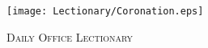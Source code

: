 \fancyhead[RE,LO]{}\fancyhead[RO,LE]{}
\fancyhead[C]{}
\thispagestyle{empty}
{}
   
\begin{figure}[H]
    \centering
    \texttt{[image: Lectionary/Coronation.eps]}
    \caption{\textsc{\Huge{Daily Office Lectionary}}}
\end{figure}